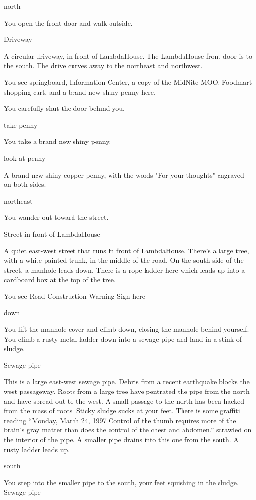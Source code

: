 \documentclass[10pt,twoside,openright]{memoir}
\begin{document}
{north

You open the front door and walk outside.

Driveway

A circular driveway, in front of LambdaHouse. The LambdaHouse front door is to
 the south. The drive curves away to the northeast and northwest.

You see springboard, Information Center, a copy of the MidNite-MOO, Foodmart shopping cart, and a brand new shiny penny here.

You carefully shut the door behind you.

take penny

You take a brand new shiny penny.

look at penny

A brand new shiny copper penny, with the words "For your thoughts" engraved on
 both sides.

northeast

You wander out toward the street.

Street in front of LambdaHouse

A quiet east-west street that runs in front of LambdaHouse. There's a large
 tree, with a white painted trunk, in the middle of the road.  On the south
 side of the street, a manhole leads down. There is a rope ladder here which
 leads up into a cardboard box at the top of the tree.

You see Road Construction Warning Sign here.

down

You lift the manhole cover and climb down, closing the manhole behind
 yourself.  You climb a rusty metal ladder down into a sewage pipe and land in
 a stink of sludge.

Sewage pipe

This is a large east-west sewage pipe.  Debris from a recent earthquake blocks
 the west passageway.  Roots from a large tree have pentrated the pipe from
 the north and have spread out to the west.  A small passage to the north has
 been hacked from the mass of roots.  Sticky sludge sucks at your feet.  There
 is some graffiti reading ``Monday, March 24, 1997  Control of the thumb
 requires more of the brain's gray matter than does the control of the chest
 and abdomen.'' scrawled on the interior of the pipe.  A smaller pipe drains
 into this one from the south.  A rusty ladder leads up.

south

You step into the smaller pipe to the south, your feet squishing in the sludge.
Sewage pipe

}
\end{document}
